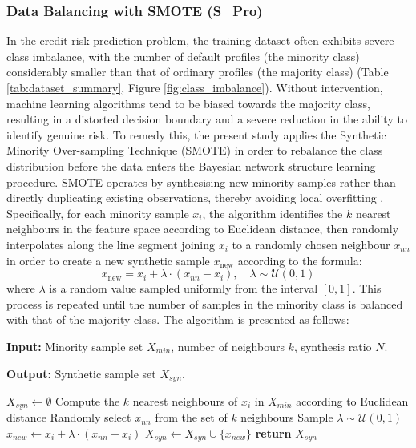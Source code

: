 \subsubsection{Data Balancing with SMOTE (S\_Pro)}
\noindent
In the credit risk prediction problem, the training dataset often exhibits severe class imbalance, with the number of default profiles (the minority class) considerably smaller than that of ordinary profiles (the majority class) (Table \ref{tab:dataset_summary}, Figure \ref{fig:class_imbalance}). Without intervention, machine learning algorithms tend to be biased towards the majority class, resulting in a distorted decision boundary and a severe reduction in the ability to identify genuine risk. To remedy this, the present study applies the Synthetic Minority Over-sampling Technique (SMOTE) in order to rebalance the class distribution before the data enters the Bayesian network structure learning procedure.
SMOTE operates by synthesising new minority samples rather than directly duplicating existing observations, thereby avoiding local overfitting \cite{chawla2002smote}. Specifically, for each minority sample $x_i$, the algorithm identifies the $k$ nearest neighbours in the feature space according to Euclidean distance, then randomly interpolates along the line segment joining $x_i$ to a randomly chosen neighbour $x_{nn}$ in order to create a new synthetic sample $x_{\text{new}}$ according to the formula:
\begin{equation}
    \label{eq:3.1}
    x_{\text{new}} = x_i + \lambda \cdot (x_{nn} - x_i), \quad \lambda \sim \mathcal{U}(0, 1)
\end{equation}
where $\lambda$ is a random value sampled uniformly from the interval $[0, 1]$. This process is repeated until the number of samples in the minority class is balanced with that of the majority class. The algorithm is presented as follows:

\vspace{0.5em}
\begin{algorithm}
\caption{Pseudocode of the SMOTE algorithm}
\vspace{0.5em}
\textbf{Input:} Minority sample set $X_{min}$, number of neighbours $k$, synthesis ratio $N$.

\vspace{0.5cm}
\textbf{Output:} Synthetic sample set $X_{syn}$.
\begin{tcolorbox}
\begin{algorithmic}[1]
    \State $X_{syn} \gets \emptyset$
        \State Compute the $k$ nearest neighbours of $x_i$ in $X_{min}$ according to Euclidean distance
            \State Randomly select $x_{nn}$ from the set of $k$ neighbours
            \State Sample $\lambda \sim \mathcal{U}(0, 1)$
            \State $x_{new} \gets x_i + \lambda \cdot (x_{nn} - x_i)$
            \State $X_{syn} \gets X_{syn} \cup \{x_{new}\}$
        \EndFor
    \EndFor
    \State \textbf{return} $X_{syn}$
\end{algorithmic}
\end{tcolorbox}
\end{algorithm}

